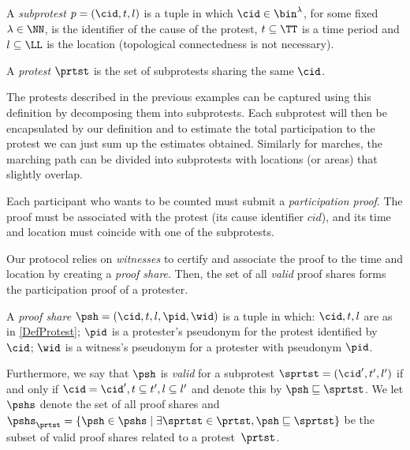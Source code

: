 \begin{definition}\label{DefProtest}
  A \emph{subprotest} \(p = (\cid, t, l)\) is a tuple in which \(\cid\in 
    \bin^{\lambda}\), for some fixed \(\lambda\in \NN\), is the identifier of 
  the cause of the protest, \(t \subseteq \TT\) is a time period and \(l 
    \subseteq \LL\) is the location (topological connectedness is not 
  necessary).

  A \emph{protest} \(\prtst\) is the set of subprotests sharing the same \(\cid\).
\end{definition}

The protests described in the previous examples can be captured using this definition by decomposing them into subprotests.
Each subprotest will then be encapsulated by our definition and to estimate the total participation to the protest we can just sum up the estimates obtained.
Similarly for marches, the marching path can be divided into subprotests with locations (or areas) that slightly overlap.

Each participant who wants to be counted must submit a \emph{participation proof}.
The proof must be associated with the protest (\ie its cause identifier \(cid\)), and its time and location must coincide with one of the subprotests.

Our protocol relies on \emph{witnesses} to certify and associate the proof to the time and location by creating a \emph{proof share}.
Then, the set of all \emph{valid} proof shares forms the participation proof of a protester.


\begin{definition}%
  \label{DefProofShare}\label{DefProofShares}
  A \emph{proof share} \(\psh = (\cid, t, l, \pid, \wid)\) is a tuple in which: 
  \(\cid, t, l\) are as in \cref{DefProtest};
  \(\pid\) is a protester's pseudonym for the protest identified by \(\cid\);
  \(\wid\) is a witness's pseudonym for a protester with pseudonym \(\pid\).

  Furthermore, we say that \(\psh\) is \emph{valid} for a subprotest \(\sprtst = (\cid', t', l')\) if and only if \(\cid = \cid', t\subseteq t', l\subseteq l'\) and denote this by 
  \(\psh \sqsubseteq \sprtst\).
  We let \(\pshs\) denote the set of all proof shares and \(
    \pshs_\prtst = \{ \psh \in \pshs \mid
      \exists \sprtst \in \prtst, \psh \sqsubseteq \sprtst \}
  \) be the subset of valid proof shares related to a protest~\(\prtst\).
\end{definition}

